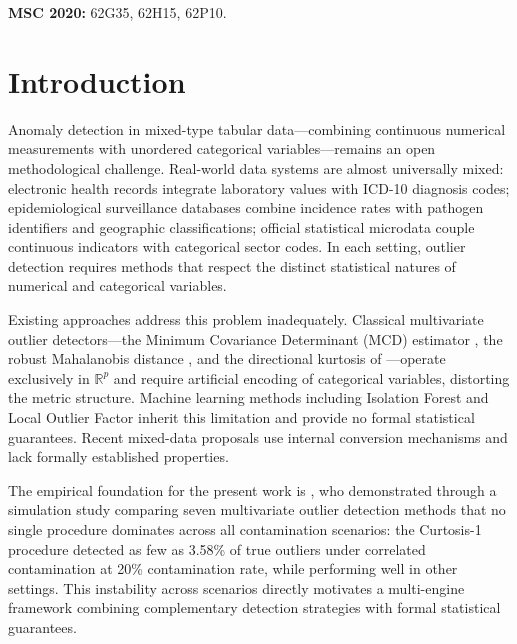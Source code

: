 \documentclass[11pt]{article}
\theoremstyle{plain}
\theoremstyle{definition}
\newcommand{\R}{\mathbb{R}}
\begin{document}
\noindent\textbf{MSC 2020:} 62G35, 62H15, 62P10.

\section{Introduction}
\label{sec:intro}

Anomaly detection in mixed-type tabular data---combining
continuous numerical measurements with unordered categorical
variables---remains an open methodological challenge.
Real-world data systems are almost universally mixed:
electronic health records integrate laboratory values with
ICD-10 diagnosis codes; epidemiological surveillance
databases combine incidence rates with pathogen identifiers
and geographic classifications; official statistical
microdata couple continuous indicators with categorical
sector codes. In each setting, outlier detection requires
methods that respect the distinct statistical natures of
numerical and categorical variables.

Existing approaches address this problem inadequately.
Classical multivariate outlier detectors---the Minimum
Covariance Determinant (MCD) estimator
\citep{rousseeuw1985}, the robust Mahalanobis distance
\citep{rousseeuw1990}, and the directional kurtosis of
\citet{pena2001}---operate exclusively in $\R^p$ and
require artificial encoding of categorical variables,
distorting the metric structure. Machine learning methods
including Isolation Forest \citep{liu2008} and Local
Outlier Factor \citep{breunig2000} inherit this limitation
and provide no formal statistical guarantees. Recent
mixed-data proposals \citep{yuan2023, cabral2025, wang2021}
use internal conversion mechanisms and lack formally
established properties.

The empirical foundation for the present work is
\citet{marcano2013}, who demonstrated through a simulation
study comparing seven multivariate outlier detection
methods that no single procedure dominates across all
contamination scenarios: the Curtosis-1 procedure
\citep{pena2001} detected as few as 3.58\% of true outliers
under correlated contamination at 20\% contamination rate,
while performing well in other settings. This instability
across scenarios directly motivates a multi-engine framework
combining complementary detection strategies with formal
statistical guarantees.
\end{document}
